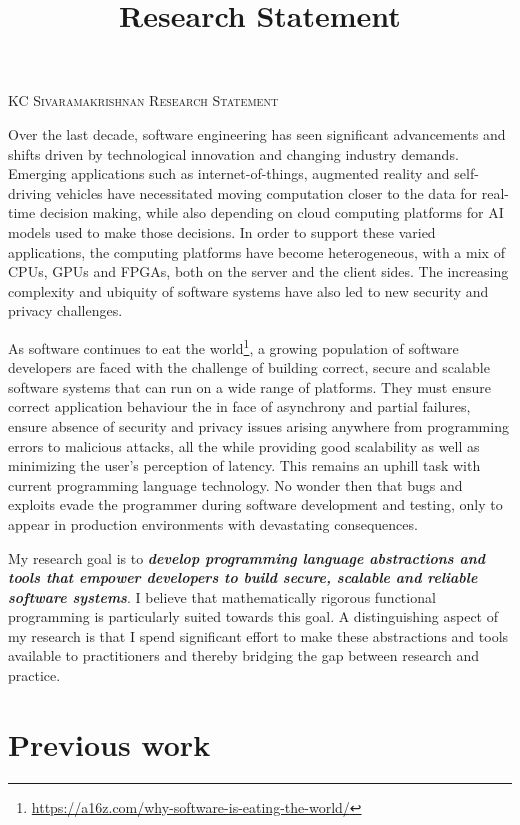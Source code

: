\documentclass[screen,acmsmall,nonacm]{acmart}
\newcommand{\loud}[1]{\textbf{\textit{#1}}}
\begin{document}
\title{Research Statement}

\noindent \Large \textsc{KC Sivaramakrishnan} \hfill \textsc{Research Statement} \normalsize

\noindent \hrulefill

Over the last decade, software engineering has seen significant advancements
and shifts driven by technological innovation and changing industry demands.
Emerging applications such as internet-of-things, augmented reality and
self-driving vehicles have necessitated moving computation closer to the data
for real-time decision making, while also depending on cloud computing
platforms for AI models used to make those decisions. In order to support these
varied applications, the computing platforms have become heterogeneous, with a
mix of CPUs, GPUs and FPGAs, both on the server and the client sides. The
increasing complexity and ubiquity of software systems have also led to new
security and privacy challenges.

As software continues to eat the
world\footnote{\url{https://a16z.com/why-software-is-eating-the-world/}}, a
growing population of software developers are faced with the challenge of
building correct, secure and scalable software systems that can run on a wide
range of platforms. They must ensure correct application behaviour the in face
of asynchrony and partial failures, ensure absence of security and privacy
issues arising anywhere from programming errors to malicious attacks, all the
while providing good scalability as well as minimizing the user's perception of
latency. This remains an uphill task with current programming language
technology. No wonder then that bugs and exploits evade the programmer during
software development and testing, only to appear in production environments
with devastating consequences.

My research goal is to \loud{develop programming language abstractions and
tools that empower developers to build secure, scalable and reliable software
systems}. I believe that mathematically rigorous functional programming is
particularly suited towards this goal. A distinguishing aspect of my research
is that I spend significant effort to make these abstractions and tools
available to practitioners and thereby bridging the gap between research and
practice.

\section{Previous work}
\end{document}
